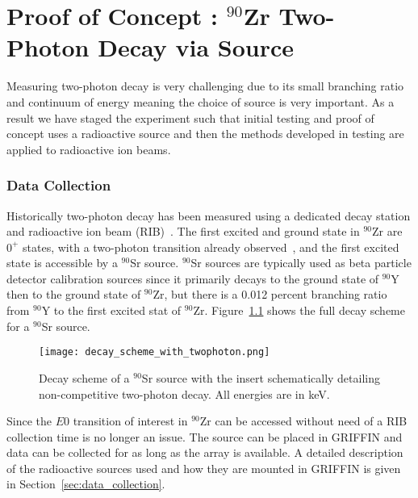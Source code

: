 \documentclass[cnatzke_thesis_proposal.tex]{subfiles}
\begin{document}
\chapter{Proof of Concept : $^{90}$Zr Two-Photon Decay via Source}


Measuring two-photon decay is very challenging due to its small branching ratio and continuum of energy meaning the choice of source is very important.
As a result we have staged the experiment such that initial testing and proof of concept uses a radioactive source and then the methods developed in testing are applied to radioactive ion beams. 

\subsection{Data Collection}
Historically two-photon decay has been measured using a dedicated decay station and radioactive ion beam (RIB)~\cite{kramp_nuclear_1987}.
The first excited and ground state in $^{90}$Zr are $0^+$ states, with a two-photon transition already observed~\cite{schirmer_double_1984}, and the first excited state is accessible by a $^{90}$Sr source.
$^{90}$Sr sources are typically used as beta particle detector calibration sources since it primarily decays to the ground state of $^{90}$Y then to the ground state of $^{90}$Zr, but there is a 0.012 percent branching ratio from $^{90}$Y to the first excited stat of $^{90}$Zr.
Figure~\ref{fig:decay_scheme_with_twophoton} shows the full decay scheme for a $^{90}$Sr source.

\begin{figure}[H]
  \centering
  \texttt{[image: decay\_scheme\_with\_twophoton.png]}
  \caption{Decay scheme of a $^{90}$Sr source with the insert schematically detailing non-competitive two-photon decay. All energies are in keV.}
  \label{fig:decay_scheme_with_twophoton}
\end{figure}

Since the $E0$ transition of interest in $^{90}$Zr can be accessed without need of a RIB collection time is no longer an issue.
The source can be placed in GRIFFIN and data can be collected for as long as the array is available. 
A detailed description of the radioactive sources used and how they are mounted in GRIFFIN is given in Section~\ref{sec:data_collection}.
\end{document}
